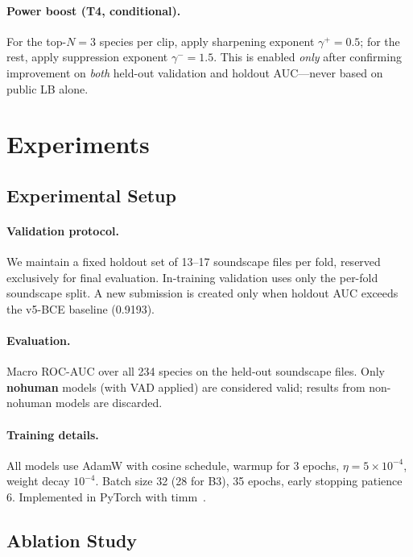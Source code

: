 \documentclass[10pt,twocolumn]{article}
\begin{document}
\paragraph{Power boost (T4, conditional).}
For the top-$N=3$ species per clip, apply sharpening exponent $\gamma^+=0.5$;
for the rest, apply suppression exponent $\gamma^-=1.5$.
This is enabled \emph{only} after confirming improvement on \emph{both}
held-out validation and holdout AUC---never based on public LB alone.

\section{Experiments}
\label{sec:exp}

\subsection{Experimental Setup}
\label{sec:setup}

\paragraph{Validation protocol.}
We maintain a fixed holdout set of 13--17 soundscape files per fold,
reserved exclusively for final evaluation.
In-training validation uses only the per-fold soundscape split.
A new submission is created only when holdout AUC exceeds the v5-BCE
baseline (0.9193).

\paragraph{Evaluation.}
Macro ROC-AUC over all 234 species on the held-out soundscape files.
Only \textbf{nohuman} models (with VAD applied) are considered valid;
results from non-nohuman models are discarded.

\paragraph{Training details.}
All models use AdamW with cosine schedule,
warmup for 3 epochs, $\eta=5\times10^{-4}$, weight decay $10^{-4}$.
Batch size 32 (28 for B3), 35 epochs, early stopping patience 6.
Implemented in PyTorch with timm~\cite{rw2019timm}.

\subsection{Ablation Study}
\label{sec:ablation}
\end{document}
